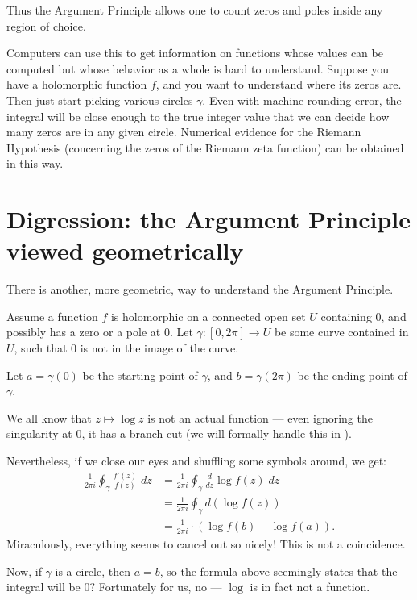 Thus the Argument Principle allows one to count zeros and poles inside any region of choice.

Computers can use this to get information on functions whose values can be computed but whose behavior as a whole
is hard to understand.
Suppose you have a holomorphic function $f$, and you want to understand where its zeros are.
Then just start picking various circles $\gamma$.
Even with machine rounding error, the integral will be close enough to the true integer value that
we can decide how many zeros are in any given circle.
Numerical evidence for the Riemann Hypothesis (concerning the zeros of the Riemann zeta function)
can be obtained in this way.

\section{Digression: the Argument Principle viewed geometrically}

There is another, more geometric, way to understand the Argument Principle.

Assume a function $f$ is holomorphic on a connected open set $U$ containing $0$,
and possibly has a zero or a
pole at $0$. Let $\gamma \colon [0, 2 \pi] \to U$ be some curve contained in $U$, such that $0$ is
not in the image of the curve.

Let $a = \gamma(0)$ be the starting point of $\gamma$, and $b = \gamma(2 \pi)$ be the ending
point of $\gamma$.

We all know that $z \mapsto \log z$ is not an actual function --- even ignoring the singularity
at $0$, it has a branch cut (we will formally handle this in ).

Nevertheless, if we close our eyes and shuffling some symbols around, we get:
\begin{align*}
	\frac{1}{2 \pi i} \oint_\gamma \frac{f'(z)}{f(z)} \; dz
	&= \frac{1}{2 \pi i} \oint_\gamma \frac{d}{dz} \log f(z) \; dz \\
	&= \frac{1}{2 \pi i} \oint_\gamma d (\log f(z)) \\
	&= \frac{1}{2 \pi i} \cdot (\log f(b) - \log f(a)).
\end{align*}
Miraculously, everything seems to cancel out so nicely! This is not a coincidence.

Now, if $\gamma$ is a circle, then $a = b$, so the formula above seemingly states that the
integral will be $0$?
Fortunately for us, no --- $\log$ is in fact not a function.

